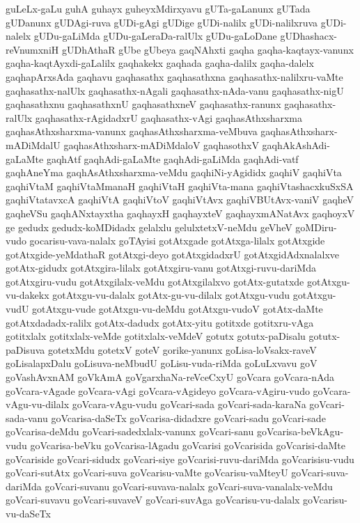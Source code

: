 {guLeLx-gaLu
guhA
guhayx
guheyxMdirxyavu
gUTa-gaLanunx
gUTada
gUDanunx
gUDAgi-ruva
gUDi-gAgi
gUDige
gUDi-nalilx
gUDi-nalilxruva
gUDi-nalelx
gUDu-gaLiMda
gUDu-gaLeraDa-ralUlx
gUDu-gaLoDane
gUDhashacx-reVnumxniH
gUDhAthaR
gUbe
gUbeya
gaqNAhxti
gaqha
gaqha-kaqtayx-vanunx
gaqha-kaqtAyxdi-gaLalilx
gaqhakekx
gaqhada
gaqha-dalilx
gaqha-dalelx
gaqhapArxsAda
gaqhavu
gaqhasathx
gaqhasathxna
gaqhasathx-nalilxru-vaMte
gaqhasathx-nalUlx
gaqhasathx-nAgali
gaqhasathx-nAda-vanu
gaqhasathx-nigU
gaqhasathxnu
gaqhasathxnU
gaqhasathxneV
gaqhasathx-ranunx
gaqhasathx-ralUlx
gaqhasathx-rAgidadxrU
gaqhasathx-vAgi
gaqhasAthxsharxma
gaqhasAthxsharxma-vanunx
gaqhasAthxsharxma-veMbuva
gaqhasAthxsharx-mADiMdalU
gaqhasAthxsharx-mADiMdaloV
gaqhasothxV
gaqhAkAshAdi-gaLaMte
gaqhAtf
gaqhAdi-gaLaMte
gaqhAdi-gaLiMda
gaqhAdi-vatf
gaqhAneYma
gaqhAsAthxsharxma-veMdu
gaqhiNi-yAgididx
gaqhiV
gaqhiVta
gaqhiVtaM
gaqhiVtaMmanaH
gaqhiVtaH
gaqhiVta-mana
gaqhiVtashacxkuSxSA
gaqhiVtatavxcA
gaqhiVtA
gaqhiVtoV
gaqhiVtAvx
gaqhiVBUtAvx-vaniV
gaqheV
gaqheVSu
gaqhANxtayxtha
gaqhayxH
gaqhayxteV
gaqhayxmANatAvx
gaqhoyxV
ge
gedudx
gedudx-koMDidadx
gelalxlu
gelulxtetxV-neMdu
geVheV
goMDiru-vudo
gocarisu-vava-nalalx
goTAyisi
gotAtxgade
gotAtxga-lilalx
gotAtxgide
gotAtxgide-yeMdathaR
gotAtxgi-deyo
gotAtxgidadxrU
gotAtxgidAdxnalalxve
gotAtx-gidudx
gotAtxgira-lilalx
gotAtxgiru-vanu
gotAtxgi-ruvu-dariMda
gotAtxgiru-vudu
gotAtxgilalx-veMdu
gotAtxgilalxvo
gotAtx-gutatxde
gotAtxgu-vu-dakekx
gotAtxgu-vu-dalalx
gotAtx-gu-vu-dilalx
gotAtxgu-vudu
gotAtxgu-vudU
gotAtxgu-vude
gotAtxgu-vu-deMdu
gotAtxgu-vudoV
gotAtx-daMte
gotAtxdadadx-ralilx
gotAtx-dadudx
gotAtx-yitu
gotitxde
gotitxru-vAga
gotitxlalx
gotitxlalx-veMde
gotitxlalx-veMdeV
gotutx
gotutx-paDisalu
gotutx-paDisuva
gotetxMdu
gotetxV
goteV
gorike-yanunx
goLisa-loVsakx-raveV
goLisalapxDalu
goLisuva-neMbudU
goLisu-vuda-riMda
goLuLxvavu
goV
goVashAvxnAM
goVkAmA
goVgarxhaNa-reVceCxyU
goVcara
goVcara-nAda
goVcara-vAgade
goVcara-vAgi
goVcara-vAgideyo
goVcara-vAgiru-vudo
goVcara-vAgu-vu-dilalx
goVcara-vAgu-vudu
goVcari-sada
goVcari-sada-karaNa
goVcari-sada-vanu
goVcarisa-daSeTx
goVcarisa-didadxre
goVcari-sadu
goVcari-sade
goVcarisa-deMdu
goVcari-sadedxlalx-vanunx
goVcari-sanu
goVcarisa-beVkAgu-vudu
goVcarisa-beVku
goVcarisa-lAgadu
goVcarisi
goVcarisida
goVcarisi-daMte
goVcariside
goVcari-sidudx
goVcari-siye
goVcarisi-ruvu-dariMda
goVcarisisu-vudu
goVcari-sutAtx
goVcari-suva
goVcarisu-vaMte
goVcarisu-vaMteyU
goVcari-suva-dariMda
goVcari-suvanu
goVcari-suvava-nalalx
goVcari-suva-vanalalx-veMdu
goVcari-suvavu
goVcari-suvaveV
goVcari-suvAga
goVcarisu-vu-dalalx
goVcarisu-vu-daSeTx
}
